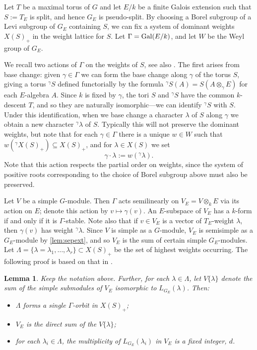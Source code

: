 \documentclass[11pt,reqno]{amsart}
\newtheorem{lemma}{Lemma}[subsection]
\theoremstyle{definition}
\theoremstyle{remark}
\theoremstyle{definition}
\theoremstyle{plain}
\begin{document}
Let $T$ be a maximal torus of $G$ and let $E/k$ be a finite Galois extension such that $S:=T_E$ is split, and hence $G_E$ is pseudo-split.
By choosing a Borel subgroup of a Levi subgroup of $G_E$ containing $S$, we can fix a system of dominant weights $X(S)_+$ in the weight lattice for $S$.
Let $\Gamma = {\rm Gal}(E/k)$, and let $W$ be the Weyl group of $G_E$.

We recall two actions of $\Gamma$ on the weights of $S$, see also \cite[Sec. 3.1]{Tit71}. 
The first arises from base change: given $\gamma\in \Gamma$ we can form the base change along $\gamma$ of the torus $S$,
giving a torus ${^\gamma}S$ defined functorially
by the formula ${^\gamma}S(A) = S(A\otimes_\gamma E)$ for each $E$-algebra $A$.
Since $k$ is fixed by $\gamma$, the tori $S$ and ${^\gamma}S$ have the common $k$-descent $T$, and so they are naturally isomorphic---we can identify ${^\gamma}S$ with $S$.
Under this identification, when we base change a character $\lambda$ of $S$ along $\gamma$ we obtain a new character ${^\gamma}\lambda$ of $S$.
Typically this will not preserve the dominant weights, but note that for each $\gamma\in \Gamma$ there is a unique $w\in W$ such that $w({^\gamma}X(S)_+)\subseteq X(S)_+$, and for $\lambda\in X(S)$ we set
\begin{equation}\label{eq:dot}
\gamma\cdot\lambda:=w({^\gamma}\lambda).
\end{equation}
Note that this action respects the partial order on weights, since the system of positive roots corresponding to the choice of Borel subgroup above must also be preserved.

Let $V$ be a simple $G$-module.
Then $\Gamma$ acts semilinearly on $V_E = V\otimes_k E$ via its action on $E$;
denote this action by $v\mapsto \gamma(v)$. 
An $E$-subspace of $V_E$ has a $k$-form if and only if it is $\Gamma$-stable.
Note also that if $v\in V_E$ is a vector of $T_E$-weight $\lambda$,
then $\gamma(v)$ has weight ${^\gamma}\lambda$.
Since $V$ is simple as a $G$-module, $V_E$ is semisimple as a $G_E$-module by \cref{lem:sepext}, and so $V_E$ is
the sum of certain simple $G_E$-modules.
Let $\Lambda = \{\lambda=\lambda_1,\ldots,\lambda_r\}\subset X(S)_+$ be the set of highest weights occurring.
The following proof is based on that in \cite[Sec. 7.6]{Tit71}.

\begin{lemma}\label{lem:Vlambda}
Keep the notation above.
Further, for each $\lambda\in \Lambda$, let $V\{\lambda\}$ denote the sum of the simple submodules of $V_E$ isomorphic to $L_{G_E}(\lambda)$. Then:
\begin{itemize}
\item[(i)] $\Lambda$ forms a single $\Gamma$-orbit in $X(S)_+$;
\item[(ii)] $V_E$ is the direct sum of the $V\{\lambda\}$;
\item[(iii)] for each $\lambda_i\in\Lambda$, the multiplicity of $L_{G_E}(\lambda_i)$ in $V_{E}$ is a fixed integer, $d$.
\end{itemize}
\end{lemma}
\end{document}
